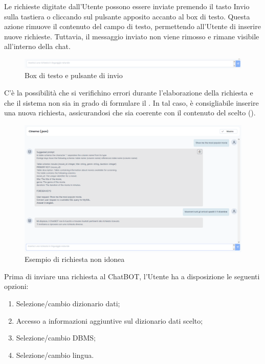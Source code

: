 \par Le richieste digitate dall'Utente possono essere inviate premendo il tasto Invio sulla tastiera o cliccando sul pulsante apposito accanto al box di testo. Questa azione rimuove il contenuto del campo di testo, permettendo all'Utente di inserire nuove richieste. Tuttavia, il messaggio inviato non viene rimosso e rimane visibile all'interno della chat.

\begin{figure}[H]
  \centering
  \includegraphics[width=\textwidth]{assets/text_box_arrow.png}
  \caption{Box di testo e pulsante di invio}
\end{figure}

\par C'è la possibilità che si verifichino errori durante l'elaborazione della richiesta e che il sistema non sia in grado di formulare il . In tal caso, è consigliabile inserire una nuova richiesta, assicurandosi che sia coerente con il contenuto del  scelto ().

\begin{figure}[H]
  \centering
  \includegraphics[width=\textwidth]{assets/es_chat_errore.png}
  \caption{Esempio di richiesta non idonea}
\end{figure}

\par Prima di inviare una richiesta al ChatBOT, l'Utente ha a disposizione le seguenti opzioni:
\begin{enumerate}
  \item Selezione/cambio dizionario dati;
  \item Accesso a informazioni aggiuntive sul dizionario dati scelto;
  \item Selezione/cambio DBMS;
  \item Selezione/cambio lingua.
\end{enumerate}

